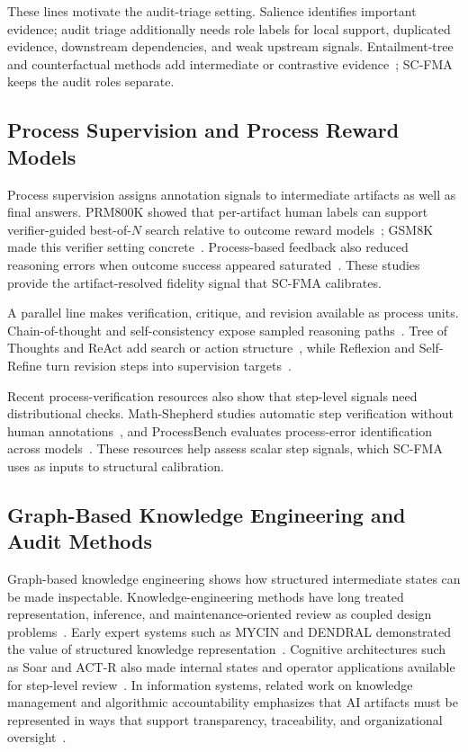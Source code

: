 \documentclass[a4paper,fleqn]{cas-sc}
\begin{document}
These lines motivate the audit-triage setting. Salience identifies important evidence; audit triage additionally needs role labels for local support, duplicated evidence, downstream dependencies, and weak upstream signals. Entailment-tree and counterfactual methods add intermediate or contrastive evidence~\cite{dalvi2021entailmenttrees,wijekoon2023counterfactual}; SC-FMA keeps the audit roles separate.

\subsection{Process Supervision and Process Reward Models}

Process supervision assigns annotation signals to intermediate artifacts as well as final answers. PRM800K showed that per-artifact human labels can support verifier-guided best-of-$N$ search relative to outcome reward models~\cite{lightman2023verify}; GSM8K made this verifier setting concrete~\cite{cobbe2021training}. Process-based feedback also reduced reasoning errors when outcome success appeared saturated~\cite{uesato2022solving}. These studies provide the artifact-resolved fidelity signal that SC-FMA calibrates.

A parallel line makes verification, critique, and revision available as process units. Chain-of-thought and self-consistency expose sampled reasoning paths~\cite{wei2022cot,wang2022selfconsistency}. Tree of Thoughts and ReAct add search or action structure~\cite{yao2023tot,yao2022react}, while Reflexion and Self-Refine turn revision steps into supervision targets~\cite{shinn2023reflexion,madaan2023selfrefine}.

Recent process-verification resources also show that step-level signals need distributional checks. Math-Shepherd studies automatic step verification without human annotations~\cite{wang2024mathshepherd}, and ProcessBench evaluates process-error identification across models~\cite{zheng2024processbench}. These resources help assess scalar step signals, which SC-FMA uses as inputs to structural calibration.

\subsection{Graph-Based Knowledge Engineering and Audit Methods}

Graph-based knowledge engineering shows how structured intermediate states can be made inspectable. Knowledge-engineering methods have long treated representation, inference, and maintenance-oriented review as coupled design problems~\cite{studer1998knowledge}. Early expert systems such as MYCIN and DENDRAL demonstrated the value of structured knowledge representation~\cite{buchanan1984mycin,lindsay1980dendral}. Cognitive architectures such as Soar and ACT-R also made internal states and operator applications available for step-level review~\cite{laird2012soar,anderson2004actr}. In information systems, related work on knowledge management and algorithmic accountability emphasizes that AI artifacts must be represented in ways that support transparency, traceability, and organizational oversight~\cite{dwivedi2021artificial,raji2020closing}.
\end{document}

